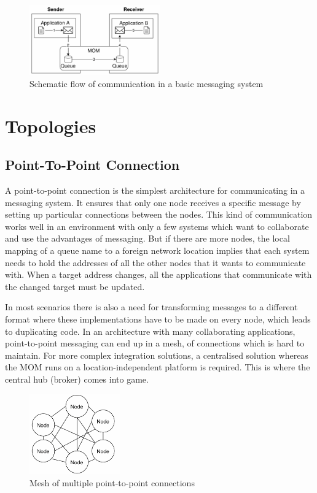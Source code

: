 \begin{figure}[H]
    \centering
    \includegraphics[width=0.5\textwidth]{images/mom-schema.png}
    \caption{Schematic flow of communication in a basic messaging system }
    \label{fig:message-oriented-middleware}
\end{figure}

\section{Topologies}
\subsection{Point-To-Point Connection}
\label{intro-messaging-pointtopoint}
A point-to-point connection is the simplest architecture for communicating in a
messaging system. It ensures that only one node receives a specific message by
setting up particular connections between the nodes. This kind of
communication works well in an environment with only a few systems which want to
collaborate and use the advantages of messaging. But if there are more
nodes, the local mapping of a queue name to a foreign network location
implies that each system needs to hold the addresses of all the other nodes that it
wants to communicate with. When a target address changes, all the applications that
communicate with the changed target must be updated. 

In most scenarios there is also a need for transforming messages to a different
format where these implementations have to be made on every node, which leads to
duplicating code. In an architecture with many collaborating applications,
point-to-point messaging can end up in a mesh, of connections which is hard to
maintain.  For more complex integration solutions, a centralised solution
whereas the MOM runs on a location-independent platform is required. This is
where the central hub (broker) comes into game. \cite{MSDNIntegration}

\begin{figure}[H]
    \centering
    \includegraphics[width=0.35\textwidth]{images/point-to-point-messaging.png}
    \caption{Mesh of multiple point-to-point connections}
    \label{fig:point-to-point-messaging}
\end{figure}

